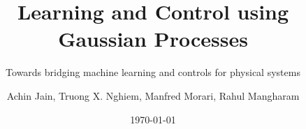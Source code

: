 \documentclass[usenames,dvipsnames,9pt]{beamer}
\title{Learning and Control using Gaussian Processes}
\subtitle{Towards bridging machine learning and controls for physical systems}
\author{Achin Jain, Truong X. Nghiem, Manfred Morari, Rahul Mangharam}
\institute{University of Pennsylvania}
\date{\today}
\begin{document}
\begin{frame} 
\titlepage
\end{frame}




\end{document}
